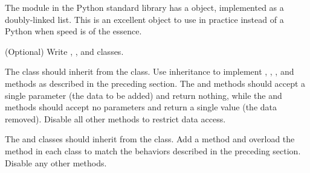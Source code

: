 The  module in the Python standard library has a  object, implemented as a doubly-linked list.
This is an excellent object to use in practice instead of a Python  when speed is of the essence.

\begin{problem}
(Optional) Write , , and  classes.

The  class should inherit from the  class.
Use inheritance to implement , , , and  methods as described in the preceding section.
The  and  methods should accept a single parameter (the data to be added) and return nothing, while the  and  methods should accept no parameters and return a single value (the data removed).
Disable all other methods to restrict data access.

The  and  classes should inherit from the  class.
Add a  method and overload the  method in each class to match the behaviors described in the preceding section.
Disable any other methods.
\end{problem}

